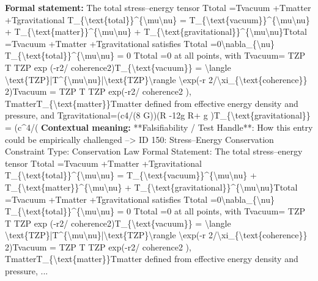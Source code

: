\begingroup\footnotesize\setlength{\emergencystretch}{3em}\sloppy
\textbf{Formal statement:} The total stress--energy tensor Ttotal  =Tvacuum  +Tmatter  +Tgravitational  T\_\{\textbackslash{}text\{total\}\}\textasciicircum{}\{\textbackslash{}mu\textbackslash{}nu\} = T\_\{\textbackslash{}text\{vacuum\}\}\textasciicircum{}\{\textbackslash{}mu\textbackslash{}nu\} + T\_\{\textbackslash{}text\{matter\}\}\textasciicircum{}\{\textbackslash{}mu\textbackslash{}nu\} + T\_\{\textbackslash{}text\{gravitational\}\}\textasciicircum{}\{\textbackslash{}mu\textbackslash{}nu\}Ttotal   =Tvacuum   +Tmatter   +Tgravitational   satisfies   Ttotal  =0\textbackslash{}nabla\_\{\textbackslash{}nu\} T\_\{\textbackslash{}text\{total\}\}\textasciicircum{}\{\textbackslash{}mu\textbackslash{}nu\} = 0   Ttotal   =0 at all points, with Tvacuum= TZP T   TZP exp (-r2/ coherence2)T\_\{\textbackslash{}text\{vacuum\}\} = \textbackslash{}langle \textbackslash{}text\{TZP\}|T\textasciicircum{}\{\textbackslash{}mu\textbackslash{}nu\}|\textbackslash{}text\{TZP\}\textbackslash{}rangle \textbackslash{}exp(-r 2/\textbackslash{}xi\_\{\textbackslash{}text\{coherence\}\} 2)Tvacuum = TZP T   TZP exp(-r2/ coherence2 ), TmatterT\_\{\textbackslash{}text\{matter\}\}Tmatter defined from effective energy density and pressure, and Tgravitational=(c4/(8 G))(R  -12g  R+ g  )T\_\{\textbackslash{}text\{gravitational\}\} = (c\textasciicircum{}4/(
\textbf{Contextual meaning:}   **Falsifiability / Test Handle**: How this entry could be empirically challenged --> ID 150: Stress--Energy Conservation Constraint Type: Conservation Law Formal Statement: The total stress--energy tensor Ttotal  =Tvacuum  +Tmatter  +Tgravitational  T\_\{\textbackslash{}text\{total\}\}\textasciicircum{}\{\textbackslash{}mu\textbackslash{}nu\} = T\_\{\textbackslash{}text\{vacuum\}\}\textasciicircum{}\{\textbackslash{}mu\textbackslash{}nu\} + T\_\{\textbackslash{}text\{matter\}\}\textasciicircum{}\{\textbackslash{}mu\textbackslash{}nu\} + T\_\{\textbackslash{}text\{gravitational\}\}\textasciicircum{}\{\textbackslash{}mu\textbackslash{}nu\}Ttotal   =Tvacuum   +Tmatter   +Tgravitational   satisfies   Ttotal  =0\textbackslash{}nabla\_\{\textbackslash{}nu\} T\_\{\textbackslash{}text\{total\}\}\textasciicircum{}\{\textbackslash{}mu\textbackslash{}nu\} = 0   Ttotal   =0 at all points, with Tvacuum= TZP T   TZP exp (-r2/ coherence2)T\_\{\textbackslash{}text\{vacuum\}\} = \textbackslash{}langle \textbackslash{}text\{TZP\}|T\textasciicircum{}\{\textbackslash{}mu\textbackslash{}nu\}|\textbackslash{}text\{TZP\}\textbackslash{}rangle \textbackslash{}exp(-r 2/\textbackslash{}xi\_\{\textbackslash{}text\{coherence\}\} 2)Tvacuum = TZP T   TZP exp(-r2/ coherence2 ), TmatterT\_\{\textbackslash{}text\{matter\}\}Tmatter defined from effective energy density and pressure, ...
